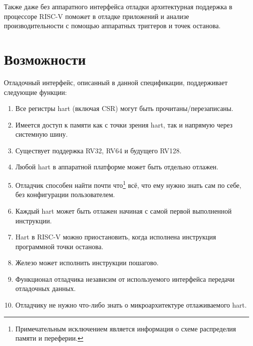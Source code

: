 Также даже без аппаратного интерфейса отладки архитектурная
поддержка в процессоре RISC-V поможет в отладке приложений и анализе
производительности с помощью аппаратных триггеров и точек останова.

\section{Возможности}

Отладочный интерфейс, описанный в данной спецификации, поддерживает следующие функции:

\begin{enumerate}
   \item Все регистры hart (включая CSR) могут быть прочитаны/перезаписаны.
   \item Имеется доступ к памяти как с точки зрения hart, так и напрямую через
       системную шину.
   \item Существует поддержка RV32, RV64 и будущего RV128.
   \item Любой hart в аппаратной платформе может быть отдельно отлажен.
   \item Отладчик способен найти почти что\footnote{Примечательным исключением
       является информация о схеме распределия памяти и переферии.} всё, что ему
       нужно знать сам по себе, без конфигурации пользователем.
   \item Каждый hart может быть отлажен начиная с самой первой выполненной инструкции.
   \item Hart в RISC-V можно приостановить, когда исполнена инструкция программной
       точки останова.
   \item Железо может исполнить инструкции пошагово.
   \item Функционал отладчика независим от используемого интерфейса передачи отладочных данных.
   \item Отладчику не нужно что-либо знать о микроархитектуре отлаживаемого hart.


\end{enumerate}

